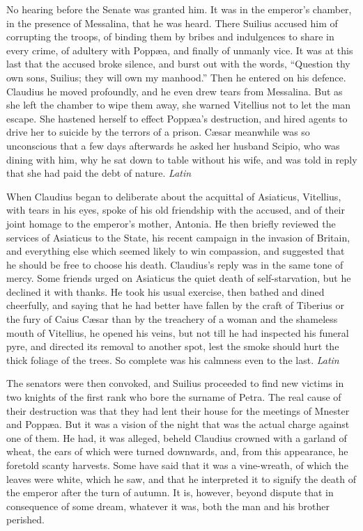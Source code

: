 
No hearing before the Senate was granted him. It was in the emperor's chamber, in the presence of Messalina, that he was heard. There Suilius accused him of corrupting the troops, of binding them by bribes and indulgences to share in every crime, of adultery with Poppæa, and finally of unmanly vice. It was at this last that the accused broke silence, and burst out with the words, ``Question thy own sons, Suilius; they will own my manhood.'' Then he entered on his defence. Claudius he moved profoundly, and he even drew tears from Messalina. But as she left the chamber to wipe them away, she warned Vitellius not to let the man escape. She hastened herself to effect Poppæa's destruction, and hired agents to drive her to suicide by the terrors of a prison. Cæsar meanwhile was so unconscious that a few days afterwards he asked her husband Scipio, who was dining with him, why he sat down to table without his wife, and was told in reply that she had paid the debt of nature. \emph{Latin}


When Claudius began to deliberate about the acquittal of Asiaticus, Vitellius, with tears in his eyes, spoke of his old friendship with the accused, and of their joint homage to the emperor's mother, Antonia. He then briefly reviewed the services of Asiaticus to the State, his recent campaign in the invasion of Britain, and everything else which seemed likely to win compassion, and suggested that he should be free to choose his death. Claudius's reply was in the same tone of mercy. Some friends urged on Asiaticus the quiet death of self-starvation, but he declined it with thanks. He took his usual exercise, then bathed and dined cheerfully, and saying that he had better have fallen by the craft of Tiberius or the fury of Caius Cæsar than by the treachery of a woman and the shameless mouth of Vitellius, he opened his veins, but not till he had inspected his funeral pyre, and directed its removal to another spot, lest the smoke should hurt the thick foliage of the trees. So complete was his calmness even to the last. \emph{Latin}


The senators were then convoked, and Suilius proceeded to find new victims in two knights of the first rank who bore the surname of Petra. The real cause of their destruction was that they had lent their house for the meetings of Mnester and Poppæa. But it was a vision of the night that was the actual charge against one of them. He had, it was alleged, beheld Claudius crowned with a garland of wheat, the ears of which were turned downwards, and, from this appearance, he foretold scanty harvests. Some have said that it was a vine-wreath, of which the leaves were white, which he saw, and that he interpreted it to signify the death of the emperor after the turn of autumn. It is, however, beyond dispute that in consequence of some dream, whatever it was, both the man and his brother perished.

